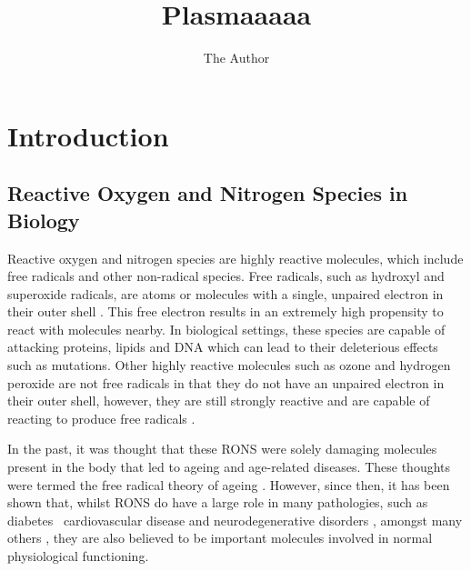 \documentclass[11pt, oneside]{article}   	%
\title{Plasmaaaaa}
\author{The Author}
\begin{document}
\maketitle
\section{Introduction}

\subsection{Reactive Oxygen and Nitrogen Species in Biology}

Reactive oxygen and nitrogen species are highly reactive molecules, which include free radicals and other non-radical species. 
Free radicals, such as hydroxyl and superoxide radicals, are atoms or molecules with a single, unpaired electron in their outer shell \cite{PhamHuy2008}. 
This free electron results in an extremely high propensity to react with molecules nearby. 
In biological settings, these species are capable of attacking proteins, lipids and DNA \cite{PhamHuy2008} which can lead to their deleterious effects such as mutations.
Other highly reactive molecules such as ozone and hydrogen peroxide are not free radicals in that they do not have an unpaired electron in their outer shell, however, they are still strongly reactive and are capable of reacting to produce free radicals \cite{PhamHuy2008}.

In the past, it was thought that these RONS were solely damaging molecules present in the body that led to ageing and age-related diseases.
These thoughts were termed the free radical theory of ageing \cite{Harman1955}. 
However, since then, it has been shown that, whilst RONS do have a large role in many pathologies, such as diabetes \, cardiovascular disease and neurodegenerative disorders \cite{Floyd1999}, amongst many others \cite{}, they are also believed to be important molecules involved in normal physiological functioning.
\end{document}
